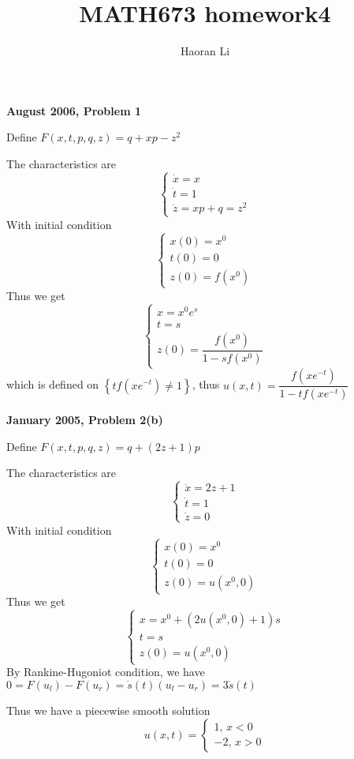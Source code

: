 \documentclass[12pt]{article}
\title{MATH673 homework4}
\author{Haoran Li}
\date{}
\begin{document}
\maketitle
\textbf{August 2006, Problem 1} \par
Define $F(x,t,p,q,z)=q+xp-z^2$ \par
The characteristics are
\[
\left\{
\begin{array}{ll}
\dot{x}=x \\
\dot{t}=1 \\
\dot{z}=xp+q=z^2
\end{array}
\right.
\]
With initial condition
\[
\left\{
\begin{array}{ll}
x(0)=x^0 \\
t(0)=0 \\
z(0)=f(x^0)
\end{array}
\right.
\]
Thus we get
\[
\left\{
\begin{array}{ll}
x = x^0e^s \\
t=s \\
z(0)=\dfrac{f(x^0)}{1-sf(x^0)}
\end{array}
\right.
\]
which is defined on $\left\{tf(xe^{-t})\neq 1\right\}$, thus $u(x,t)=\dfrac{f(xe^{-t})}{1-tf(xe^{-t})}$ \par
\textbf{January 2005, Problem 2(b)} \par
Define $F(x,t,p,q,z)=q+(2z+1)p$ \par
The characteristics are
\[
\left\{
\begin{array}{ll}
\dot{x}=2z+1 \\
\dot{t}=1 \\
\dot{z}=0
\end{array}
\right.
\]
With initial condition
\[
\left\{
\begin{array}{ll}
x(0)=x^0 \\
t(0)=0 \\
z(0)=u(x^0,0)
\end{array}
\right.
\]
Thus we get
\[
\left\{
\begin{array}{ll}
x = x^0+\left(2u(x^0,0)+1\right)s \\
t=s \\
z(0)=u(x^0,0)
\end{array}
\right.
\]
By Rankine-Hugoniot condition, we have $0=F(u_l)-F(u_r)=\dot{s}(t)(u_l-u_r)=3\dot{s}(t)$ \par
Thus we have a piecewise smooth solution
\[
u(x,t)=
\left\{
\begin{array}{ll}
1,\,x<0 \\
-2,\,x>0
\end{array}
\right.
\]
\end{document}
